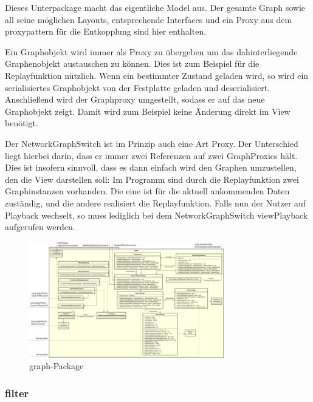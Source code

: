     Dieses Unterpackage macht das eigentliche Model aus. Der gesamte Graph sowie
    all seine möglichen Layouts, entsprechende Interfaces und ein Proxy aus dem
    \gls{proxypattern} für die Entkopplung sind hier enthalten.\par
    Ein Graphobjekt wird immer als Proxy zu übergeben um das dahinterliegende Graphenobjekt austauschen zu können. Dies ist zum Beispiel
    für die Replayfunktion nützlich. Wenn ein bestimmter Zustand geladen wird, so wird ein serialisiertes
    Graphobjekt von der Festplatte geladen und deserialisiert. Anschließend wird der Graphproxy
    umgestellt, sodass er auf das neue Graphobjekt zeigt. Damit wird zum Beispiel keine Änderung direkt im View benötigt.\par
    Der NetworkGraphSwitch ist im Prinzip auch eine Art Proxy. Der Unterschied liegt hierbei darin, dass
    er immer zwei Referenzen auf zwei GraphProxies hält. Dies ist insofern sinnvoll, dass es dann einfach wird
    den Graphen umzustellen, den die View darstellen soll: Im Programm sind durch die Replayfunktion zwei
    Graphinstanzen vorhanden. Die eine ist für die aktuell ankommenden Daten zuständig, und die andere realisiert
    die Replayfunktion. Falls nun der Nutzer auf Playback wechselt, so muss lediglich bei dem NetworkGraphSwitch
    viewPlayback aufgerufen werden.

    \clearpage
    \begin{figure}
      \centering
      \includegraphics[width=\textwidth]{../diagramimages/graph.png}
      \caption{graph-Package}
    \end{figure}
    \clearpage

    \subsubsection{filter}
    \label{subsubsec:filter}

